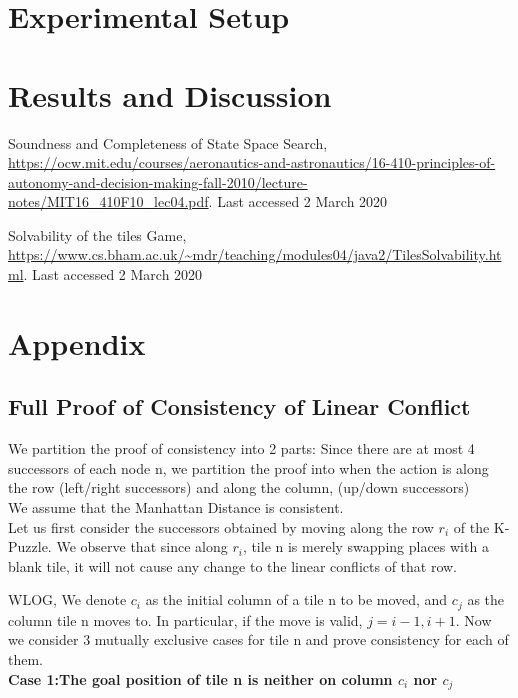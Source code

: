 \documentclass{llncs}
\begin{document}
\section{Experimental Setup}
\section{Results and Discussion}


\begin{thebibliography}{8}
Soundness and Completeness of State Space Search, \url{https://ocw.mit.edu/courses/aeronautics-and-astronautics/16-410-principles-of-autonomy-and-decision-making-fall-2010/lecture-notes/MIT16\_410F10\_lec04.pdf}. Last accessed 2 March 2020

Solvability of the tiles Game, \\ \url{https://www.cs.bham.ac.uk/~mdr/teaching/modules04/java2/TilesSolvability.html}. Last accessed 2 March 2020


\end{thebibliography}

\section{Appendix}

\subsection{Full Proof of Consistency of Linear Conflict}

We partition the proof of consistency into 2 parts:
Since there are at most 4 successors of each node n, we partition the proof into when the action is along the row (left/right successors) and along the column, (up/down successors) \\

We assume that the Manhattan Distance is consistent.\\

Let us first consider the successors obtained by moving along the row $r_i$ of the K-Puzzle. We observe that since along $r_i$, tile n is merely swapping places with a
blank tile, it will not cause any change to the linear conflicts of that row.

WLOG, We denote $c_i$ as the initial column of a tile n to be moved, and $c_j$ as the column tile n moves to. In particular, if the move is valid, $j= i-1, i+1$.
Now we consider 3 mutually exclusive cases for tile n and prove consistency for each of them.
\\
\textbf{Case 1:The goal position of tile n is neither on column $c_i$ nor $c_j$}
\end{document}
